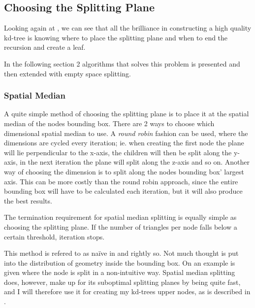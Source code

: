 \subsection{Choosing the Splitting Plane}\label{sec:splittingPlane}


Looking again at , we can see that all the
brilliance in constructing a high quality kd-tree is knowing where to
place the splitting plane and when to end the recursion and create a
leaf.


In the following section 2 algorithms that solves this problem is
presented and then extended with empty space splitting.


\subsubsection{Spatial Median}



A quite simple method of choosing the splitting plane is to place it
at the spatial median of the nodes bounding box. There are 2 ways to
choose which dimensional spatial median to use. A \textit{round robin}
fashion can be used, where the dimensions are cycled every iteration;
ie. when creating the first node the plane will lie perpendicular to
the x-axis, the children will then be split along the y-axis, in the
next iteration the plane will split along the z-axis and so
on. Another way of choosing the dimension is to split along the nodes
bounding box' largest axis. This can be more costly than the round
robin approach, since the entire bounding box will have to be
calculated each iteration, but it will also produce the best results.

The termination requirement for spatial median splitting is equally
simple as choosing the splitting plane. If the number of triangles per
node falls below a certain threshold, iteration stops.


This method is refered to as naïve in  and
rightly so. Not much thought is put into the distribution of geometry
inside the bounding box. On  an example is
given where the node is split in a non-intuitive way. Spatial median
splitting does, however, make up for its suboptimal splitting planes
by being quite fast, and I will therefore use it for creating my
kd-trees upper nodes, as is described in .


